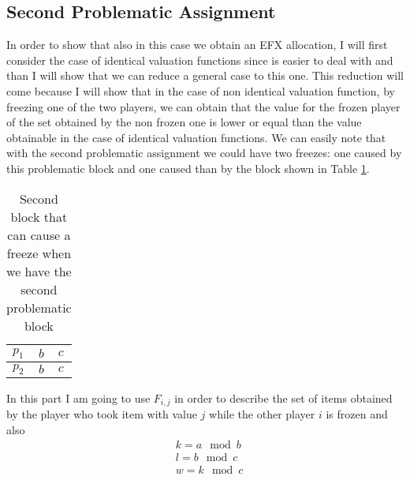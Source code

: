 \subsection{Second Problematic Assignment}
\label{section:secondproblassignment-2players-3values}
In order to show that also in this case we obtain an EFX allocation, I will first consider the case of identical valuation functions since is easier to deal with and than I will show that we can reduce a general case to this one. This reduction will come because I will show that in the case of non identical valuation function, by freezing one of the two players, we can obtain that the value for the frozen player of the set obtained by the non frozen one is lower or equal than the value obtainable in the case of identical valuation functions.  We can easily note that with the second problematic assignment we could have two freezes: one caused by this problematic block and one caused than by the block shown in Table \ref{table:bbcc-block}.
\begin{table}[h]
        \centering
        \begin{tabular}{|l|l|l|}
            \hline
            $p_1$ & $b$ & $c$ \\ \hline
            $p_2$ & $b$ & $c$ \\ \hline
        \end{tabular}
        
        \caption{Second block that can cause a freeze when we have the second problematic block}
        \label{table:bbcc-block}
    \end{table}
In this part I am going to use $F_{i,j}$ in order to describe the set of items obtained by the player who took item with value $j$ while the other player $i$ is frozen and also
\begin{align*}
    &k = a\mod b\\
    &l = b \mod c\\
    &w = k \mod c
\end{align*}
